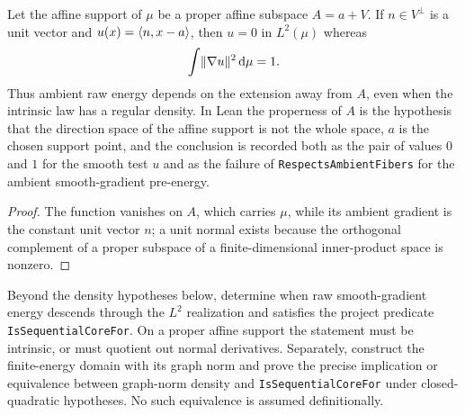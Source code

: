 \begin{obstruction}
  \label{obs:normal-direction-raw-energy}
  \leanok
  Let the affine support of $\mu$ be a proper affine subspace $A=a+V$.  If $n\in V^\perp$ is a
  unit vector and $u(x)=\langle n,x-a\rangle$, then $u=0$ in $L^2(\mu)$ whereas
  \[
    \int\lVert\nabla u\rVert^2\,\mathrm d\mu=1.
  \]
  Thus ambient raw energy depends on the extension away from $A$, even when the intrinsic law has
  a regular density.  In Lean the properness of $A$ is the hypothesis that the direction space
  of the affine support is not the whole space, $a$ is the chosen support point, and the
  conclusion is recorded both as the pair of values $0$ and $1$ for the smooth test $u$ and as
  the failure of \texttt{RespectsAmbientFibers} for the ambient smooth-gradient pre-energy.
\end{obstruction}
\begin{proof}
  \leanok
  The function vanishes on $A$, which carries $\mu$, while its ambient gradient is the constant
  unit vector $n$; a unit normal exists because the orthogonal complement of a proper subspace
  of a finite-dimensional inner-product space is nonzero.
\end{proof}

\begin{question}
  \label{q:smooth-gradient-raw-core-agreement}
  Beyond the density hypotheses below, determine when raw smooth-gradient energy descends through
  the $L^2$ realization and satisfies the project predicate \texttt{IsSequentialCoreFor}.  On a
  proper affine support the statement must be intrinsic, or must quotient out normal derivatives.
  Separately, construct the finite-energy domain with its graph norm and prove the precise
  implication or equivalence between graph-norm density and \texttt{IsSequentialCoreFor} under
  closed-quadratic hypotheses.  No such equivalence is assumed definitionally.
\end{question}


